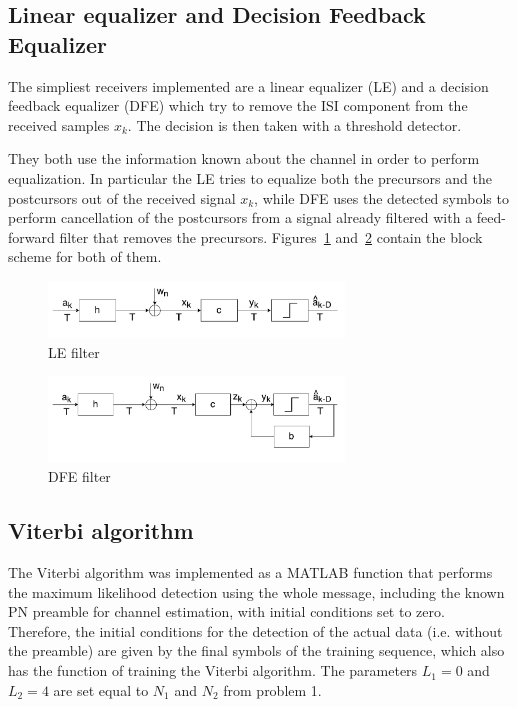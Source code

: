 \documentclass[10pt]{article}
\begin{document}
\subsection*{Linear equalizer and Decision Feedback Equalizer}
The simpliest receivers implemented are a linear equalizer (LE) and a decision feedback equalizer (DFE) which try to remove the ISI component from the received samples $x_k$. The decision is then taken with a threshold detector. 

They both use the information known about the channel in order to perform equalization. In particular the LE tries to equalize both the precursors and the postcursors out of the received signal $x_k$, while DFE uses the detected symbols to perform cancellation of the postcursors from a signal already filtered with a feed-forward filter that removes the precursors. Figures~\ref{fig:LE} and~\ref{fig:DFE} contain the block scheme for both of them. 
\begin{figure}[h!]
	\centering
	\includegraphics[width = 0.7\textwidth]{LE}
	\caption{LE filter}
	\label{fig:LE}
\end{figure}

\begin{figure}[h!]
	\centering
	\includegraphics[width=0.7\textwidth]{DFE}
	\caption{DFE filter}
	\label{fig:DFE}
\end{figure}


\subsection*{Viterbi algorithm}

The Viterbi algorithm was implemented as a MATLAB function that performs the maximum likelihood detection using the whole message, including the known PN preamble for channel estimation, with initial conditions set to zero. Therefore, the initial conditions for the detection of the actual data (i.e. without the preamble) are given by the final symbols of the training sequence, which also has the function of training the Viterbi algorithm. The parameters $L_1 = 0$ and $L_2 = 4$ are set equal to $N_1$ and $N_2$ from problem 1.
\end{document}
